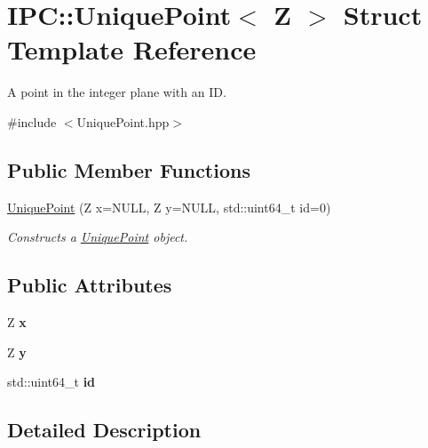 \hypertarget{struct_i_p_c_1_1_unique_point}{}\section{I\+PC\+:\+:Unique\+Point$<$ Z $>$ Struct Template Reference}
\label{struct_i_p_c_1_1_unique_point}


A point in the integer plane with an ID.  




{\ttfamily \#include $<$Unique\+Point.\+hpp$>$}

\subsection*{Public Member Functions}
\begin{DoxyCompactItemize}
\item 
\hyperlink{struct_i_p_c_1_1_unique_point_a16f97e3bd4f448277c466e969bf706ea}{Unique\+Point} (Z x=N\+U\+LL, Z y=N\+U\+LL, std\+::uint64\+\_\+t id=0)
\begin{DoxyCompactList}\small\item\em Constructs a \hyperlink{struct_i_p_c_1_1_unique_point}{Unique\+Point} object. \end{DoxyCompactList}\end{DoxyCompactItemize}
\subsection*{Public Attributes}
\begin{DoxyCompactItemize}
\item 
Z {\bfseries x}\hypertarget{struct_i_p_c_1_1_unique_point_ab11f6083ec4d20f05df89ae94838b451}{}\label{struct_i_p_c_1_1_unique_point_ab11f6083ec4d20f05df89ae94838b451}

\item 
Z {\bfseries y}\hypertarget{struct_i_p_c_1_1_unique_point_a4aeae4a98f38acce434542d241b49ef8}{}\label{struct_i_p_c_1_1_unique_point_a4aeae4a98f38acce434542d241b49ef8}

\item 
std\+::uint64\+\_\+t {\bfseries id}\hypertarget{struct_i_p_c_1_1_unique_point_a656474d94bdf182fe4ebdefd697c9c7b}{}\label{struct_i_p_c_1_1_unique_point_a656474d94bdf182fe4ebdefd697c9c7b}

\end{DoxyCompactItemize}


\subsection{Detailed Description}

